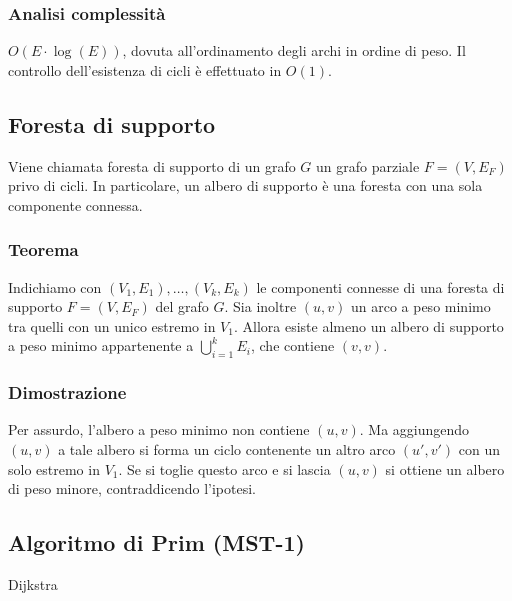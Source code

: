\documentclass[../template]{subfiles}
\begin{document}
\subsubsection{Analisi complessità}
$O(E \cdot \log (E))$, dovuta all'ordinamento degli archi in ordine di peso.
Il controllo dell'esistenza di cicli è effettuato in $O(1)$.

\subsection{Foresta di supporto}
Viene chiamata foresta di supporto di un grafo $G$ un grafo parziale $F = (V, E_F)$ privo di cicli. In particolare, un albero di
supporto è una foresta con una sola componente connessa.

\subsubsection{Teorema}
Indichiamo con $(V_1, E_1),\ldots ,(V_k, E_k)$ le componenti connesse di una foresta di supporto
$F = (V, E_F)$ del grafo $G$. Sia inoltre $(u, v)$ un arco a peso minimo tra quelli con un unico estremo
in $V_1$. Allora esiste almeno un albero di supporto a peso minimo appartenente a $\bigcup^k_{i=1} E_i$,
che contiene $(v, v)$.

\subsubsection{Dimostrazione}
Per assurdo, l'albero a peso minimo non contiene $(u, v)$. Ma aggiungendo $(u, v)$ a tale albero si forma un
ciclo contenente un altro arco $(u', v')$  con un solo estremo in $V_1$.
Se si toglie questo arco e si lascia $(u, v)$ si ottiene un albero di peso minore,
contraddicendo l'ipotesi.

\newpage
\subsection{Algoritmo di Prim (MST-1)}
Dijkstra
\begin{center}
\end{center}

\end{document}
